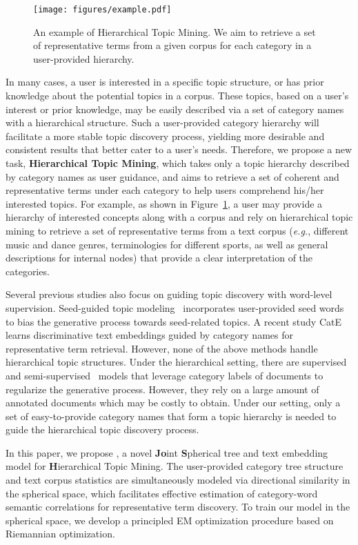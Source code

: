 \documentclass[sigconf]{acmart}
\newcommand{\eg}{\emph{e.g.}}
\theoremstyle{definition}
\begin{document}
\begin{figure}[t]
\centering
\texttt{[image: figures/example.pdf]}
\caption{An example of Hierarchical Topic Mining. We aim to retrieve a set of representative terms from a given corpus for each category in a user-provided hierarchy.}
\label{fig:eg}
\end{figure}
In many cases, a user is interested in a specific topic structure, or has prior knowledge about the potential topics in a corpus. 
These topics, based on a user's interest or prior knowledge, may be easily described via a set of category names with a hierarchical structure.
Such a user-provided category hierarchy will facilitate a more stable topic discovery process, yielding more desirable and consistent results that better cater to a user's needs. 
Therefore, we propose a new task, \textbf{Hierarchical Topic Mining}, which takes only a topic hierarchy described by category names as user guidance, and aims to retrieve a set of coherent and representative terms under each category to help users comprehend his/her interested topics. For example, as shown in Figure~\ref{fig:eg}, a user may provide a hierarchy of interested concepts along with a corpus and rely on hierarchical topic mining to retrieve a set of representative terms from a text corpus (\eg, different music and dance genres, terminologies for different sports, as well as general descriptions for internal nodes) that provide a clear interpretation of the categories. 

Several previous studies also focus on guiding topic discovery with word-level supervision. Seed-guided topic modeling~\cite{Andrzejewski2009LatentDA,Jagarlamudi2012IncorporatingLP} incorporates user-provided seed words to bias the generative process towards seed-related topics. A recent study CatE~\cite{Meng2020DiscriminativeTM} learns discriminative text embeddings guided by category names for representative term retrieval. However, none of the above methods handle hierarchical topic structures. Under the hierarchical setting, there are supervised~\cite{Perotte2011HierarchicallySL} and semi-supervised~\cite{Mao2012SSHLDAAS} models that leverage category labels of documents to regularize the generative process. However, they rely on a large amount of annotated documents which may be costly to obtain. Under our setting, only a set of easy-to-provide category names that form a topic hierarchy is needed to guide the hierarchical topic discovery process.

In this paper, we propose \josh, a novel \textbf{Jo}int \textbf{S}pherical tree and text embedding model for \textbf{H}ierarchical Topic Mining. The user-provided category tree structure and text corpus statistics are simultaneously modeled via directional similarity in the spherical space, which facilitates effective estimation of category-word semantic correlations for representative term discovery. To train our model in the spherical space, we develop a principled EM optimization procedure based on Riemannian optimization.
\end{document}
